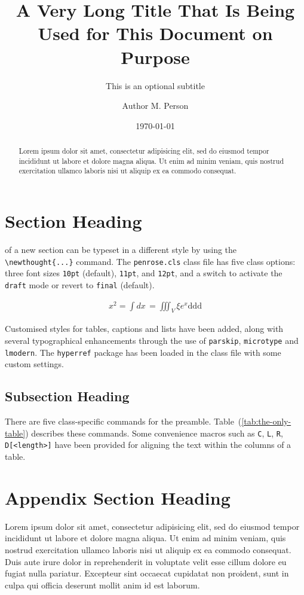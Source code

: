 \documentclass[11pt]{penrose}
\title[Title for the Header]{A Very Long Title That Is Being Used for This Document on Purpose}
\subtitle{This is an optional subtitle}
\author{Author M. Person}
\affiliation{Some Affiliation, City}
\date{\today}
\begin{document}
\maketitle
\begin{abstract}
  Lorem ipsum dolor sit amet, consectetur adipisicing elit, sed do eiusmod tempor
  incididunt ut labore et dolore magna aliqua. Ut enim ad minim veniam, quis nostrud
  exercitation ullamco laboris nisi ut aliquip ex ea commodo consequat.
\end{abstract}

\section{Section Heading}
 of a new section can be typeset in a different style by
using the \verb|\newthought{...}| command. The \texttt{penrose.cls} class file has five
class options: three font sizes \texttt{10pt} (default), \texttt{11pt}, and
\texttt{12pt}, and a switch to activate the \texttt{draft} mode or revert to
\texttt{final} (default).

\begin{align}
  x^{2} = \int dx \,  = \iiint_{V} \xi e^{x}  \text{d}  \text{d}  \text{d}
\end{align}

Customised styles for tables, captions and lists have been added, along with several
typographical enhancements through the use of \texttt{parskip}, \texttt{microtype} and
\texttt{lmodern}. The \texttt{hyperref} package has been loaded in the class file with
some custom settings.

\subsection{Subsection Heading}
There are five class-specific commands for the preamble.
Table~(\ref{tab:the-only-table}) describes these commands. Some convenience macros such as \texttt{C}, \texttt{L},
\texttt{R}, \texttt{D[<length>]} have been provided for aligning the text within the
columns of a table.
\appendix


\section{Appendix Section Heading}
Lorem ipsum dolor sit amet, consectetur adipisicing elit, sed do eiusmod tempor
incididunt ut labore et dolore magna aliqua. Ut enim ad minim veniam, quis nostrud
exercitation ullamco laboris nisi ut aliquip ex ea commodo consequat. Duis aute irure
dolor in reprehenderit in voluptate velit esse cillum dolore eu fugiat nulla pariatur.
Excepteur sint occaecat cupidatat non proident, sunt in culpa qui officia deserunt mollit
anim id est laborum.
\end{document}

